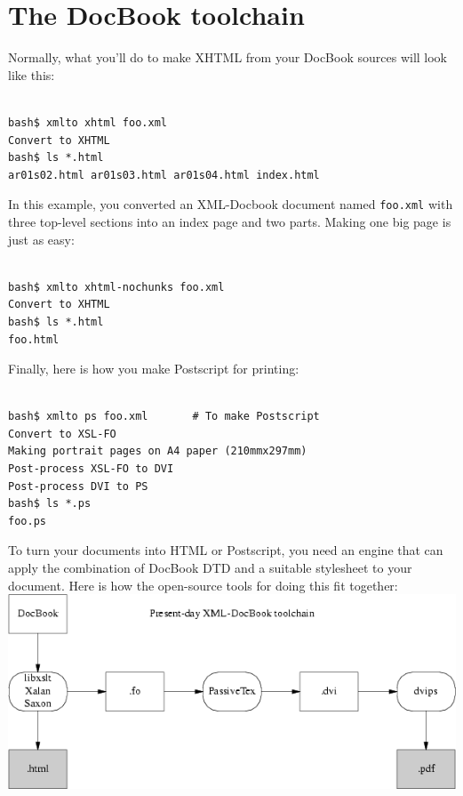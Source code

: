 \documentclass[pdftex,english,a4paper,10pt]{infocom}
\begin{document}
\section{The DocBook toolchain}
\label{id2719272}\hypertarget{id2719272}{}%

Normally, what you'll do to make XHTML from your
DocBook sources will look like this:

\begin{Verbatim}[]

bash$ xmlto xhtml foo.xml
Convert to XHTML
bash$ ls *.html
ar01s02.html ar01s03.html ar01s04.html index.html

\end{Verbatim}

In this example, you converted an XML-Docbook  document named 
{\tt{foo.xml}} with three top-level sections into an
index page and two parts.  Making one big page is just as easy:

\begin{Verbatim}[]

bash$ xmlto xhtml-nochunks foo.xml
Convert to XHTML
bash$ ls *.html
foo.html

\end{Verbatim}

Finally, here is how you make Postscript for printing:

\begin{Verbatim}[]

bash$ xmlto ps foo.xml       # To make Postscript
Convert to XSL-FO
Making portrait pages on A4 paper (210mmx297mm)
Post-process XSL-FO to DVI
Post-process DVI to PS
bash$ ls *.ps
foo.ps

\end{Verbatim}

To turn your documents into HTML or Postscript, you need an
engine that can apply the combination of DocBook DTD and 
a suitable stylesheet to your document.  Here is how the 
open-source tools for doing this fit together:
{{\includegraphics[]{figure2.png}}}
\end{document}
